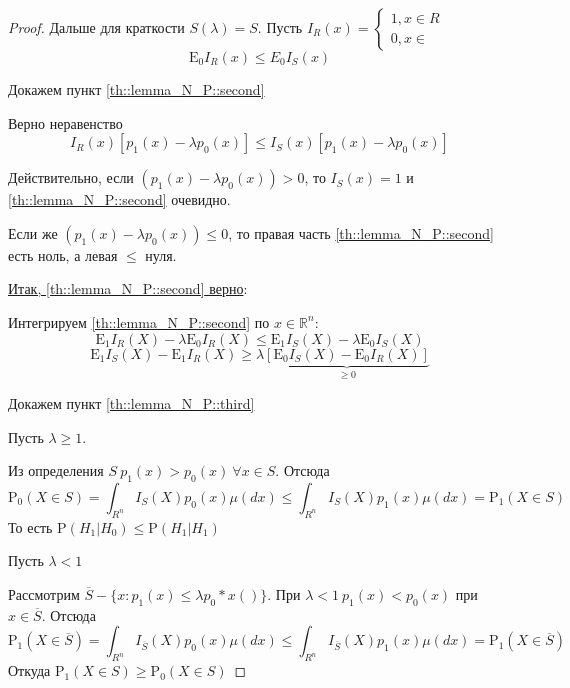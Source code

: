 \documentclass[12pt]{article}
\theoremstyle{theorem}
\def\R{
    \mathbb{R}
}
\def\E{
    \mathrm{E}
}
\def\P{
    \mathrm{P}
}
\begin{document}
\begin{proof}
    Дальше для краткости $S(\lambda) = S$. Пусть
    $I_R(x) = \begin{cases}
        1, x\in R \\
        0, x\in 
    \end{cases}$
    \begin{equation}
        \E_0I_R(x) \leq E_0I_S(x)
    \end{equation}

    Докажем пункт \ref{th::lemma_N_P::second}

    Верно неравенство
    \begin{equation*}
        I_R(x)[p_1(x) - \lambda p_0(x)] \leq I_S(x)[p_1(x) - \lambda p_0(x)]
    \end{equation*}

    Действительно, если $(p_1(x) - \lambda p_0(x)) > 0$,
    то $I_S(x) = 1$ и \ref{th::lemma_N_P::second} очевидно.

    Если же $(p_1(x) - \lambda p_0(x)) \leq 0$, то правая часть
    \ref{th::lemma_N_P::second} есть ноль, а левая $\leq$ нуля.

    \underline{Итак, \ref{th::lemma_N_P::second} верно}:

    Интегрируем \ref{th::lemma_N_P::second} по $x\in\R^n$:
    $$\E_1I_R(X) - \lambda\E_0I_R(X) \leq \E_1I_S(X) - \lambda\E_0I_S(X)$$
    \begin{equation}
        \E_1I_S(X) - \E_1I_R(X) \geq \lambda\underbrace{[\E_0I_S(X) - \E_0I_R(X)]}_{\geq 0}
    \end{equation}
    
    Докажем пункт \ref{th::lemma_N_P::third}

    Пусть $\lambda \geq 1$.
    
    Из определения $S\ p_1(x) > p_0(x) \ \forall x\in S.$
    Отсюда
    $$\P_0(X\in S) = \int_{R^n} I_S(X)p_0(x)\mu(dx) \leq \int_{R^n} I_S(X)p_1(x)\mu(dx) = \P_1(X\in S)$$ 
    То есть $\P(H_1 | H_0) \leq \P(H_1 | H_1)$

    Пусть $\lambda < 1$

    Рассмотрим $\overline{S} - \{x: p_1(x) \leq \lambda p_0*x()\}$.
    При $\lambda < 1\ p_1(x) < p_0(x)$ при $x\in \overline{S}$.
    Отсюда
    $$\P_1(X\in \overline{S}) = \int_{R^n} I_{\overline{S}}(X)p_0(x)\mu(dx) \leq \int_{R^n} I_{\overline{S}}(X)p_1(x)\mu(dx) = \P_1(X\in \overline{S})$$ 
    Откуда
    $\P_1(X\in S) \geq \P_0 (X\in S)$
\end{proof}
\end{document}
